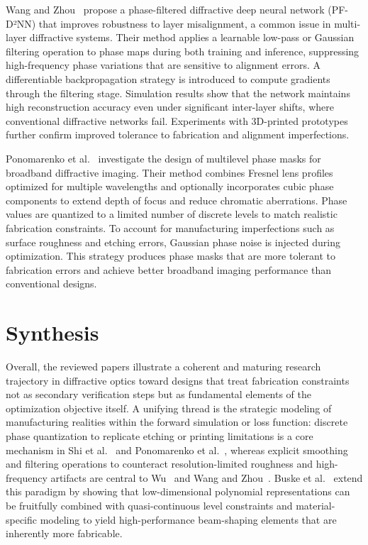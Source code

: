 \documentclass[12pt]{article}
\begin{document}
Wang and Zhou~\cite{wang2025misalignment} propose a phase-filtered diffractive deep neural network (PF-D²NN) that improves robustness to layer misalignment, a common issue in multi-layer diffractive systems. Their method applies a learnable low-pass or Gaussian filtering operation to phase maps during both training and inference, suppressing high-frequency phase variations that are sensitive to alignment errors. A differentiable backpropagation strategy is introduced to compute gradients through the filtering stage. Simulation results show that the network maintains high reconstruction accuracy even under significant inter-layer shifts, where conventional diffractive networks fail. Experiments with 3D-printed prototypes further confirm improved tolerance to fabrication and alignment imperfections.

Ponomarenko et al.~\cite{ponomarenko2019phase} investigate the design of multilevel phase masks for broadband diffractive imaging. Their method combines Fresnel lens profiles optimized for multiple wavelengths and optionally incorporates cubic phase components to extend depth of focus and reduce chromatic aberrations. Phase values are quantized to a limited number of discrete levels to match realistic fabrication constraints. To account for manufacturing imperfections such as surface roughness and etching errors, Gaussian phase noise is injected during optimization. This strategy produces phase masks that are more tolerant to fabrication errors and achieve better broadband imaging performance than conventional designs.

\section{Synthesis}

Overall, the reviewed papers illustrate a coherent and maturing research trajectory in diffractive optics toward designs that treat fabrication constraints not as secondary verification steps but as fundamental elements of the optimization objective itself. A unifying thread is the strategic modeling of manufacturing realities within the forward simulation or loss function: discrete phase quantization to replicate etching or printing limitations is a core mechanism in Shi et al.~\cite{shi2021robust} and Ponomarenko et al.~\cite{ponomarenko2019phase}, whereas explicit smoothing and filtering operations to counteract resolution-limited roughness and high-frequency artifacts are central to Wu~\cite{wu2024phase} and Wang and Zhou~\cite{wang2025misalignment}. Buske et al.~\cite{buske2025diffractive} extend this paradigm by showing that low-dimensional polynomial representations can be fruitfully combined with quasi-continuous level constraints and material-specific modeling to yield high-performance beam-shaping elements that are inherently more fabricable.
\end{document}
